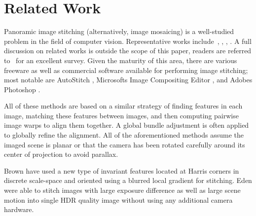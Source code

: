 \documentclass[10pt,twocolumn,letterpaper]{article}
\begin{document}
\section{Related Work}

Panoramic image stitching (alternatively, image mosaicing) is a
well-studied problem in the field of computer vision.  Representative
works include~\cite{Milgram1975}, \cite{Milgram1977}, \cite{Capel},
\cite{Szeliski1997} \cite{Brown07} \cite{Brown03}.  A full discussion
on related works is outside the scope of this paper, readers are
referred to~\cite{Szeliski05imagealignment} for an excellent survey.
Given the maturity of this area, there are various freeware as well as
commercial software available for performing image stitching; most
notable are AutoStitch \cite{autostitch}, Microsoft\textsc{}s Image
Compositing Editor \cite{ICE}, and Adobe\textsc{}s Photoshop
\cite{photoshop}.

All of these methods are based on a similar strategy of finding
features in each image, matching these features between images, and
then computing pairwise image warps to align them together.  A global
bundle adjustment is often applied to globally refine the alignment.
All of the aforementioned methods assume the imaged scene is planar or
that the camera has been rotated carefully around its center of
projection to avoid parallax.


Brown \etal \cite{Brown05} have used a new type of invariant features
located at Harris corners in discrete scale-space and oriented using a
blurred local gradient for stitching. Eden \etal \cite{Eden} were
able to stitch images with large exposure difference as well as large
scene motion into single HDR quality image without using any
additional camera hardware.
\end{document}
